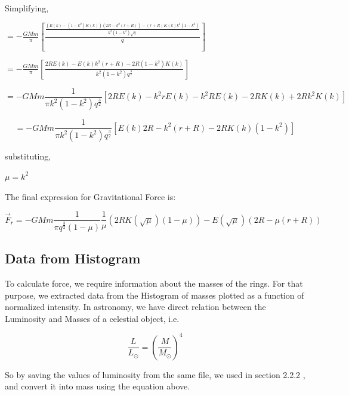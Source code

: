 Simplifying,

\begin{center}


$ = - \frac{GMm }{\pi} [\frac{\frac{(E(k)- (1 - k^2 )K(k))(2 R - k^2 (r + R)) - (r + R) K(k) k^2 (1 - k^2)}{k^2 (1-k^2)\sqrt{q}}}{q}] $


$ = - \frac{GMm }{\pi} [\frac{2 R E(k) - E (k) k^2 (r+R) - 2 R(1-k^2) K(k)}{k^2 (1 - k^2) q^\frac{3}{2}}] $





\begin{equation}
 = - GMm \frac{1}{\pi k^2 (1 - k ^2)  q^\frac{3}{2}} [2 R E (k) - k^2 r E(k)- k^2 R E(k) - 2 R K(k) + 2 R k^2 K(k)]
\end{equation}

\begin{equation}
 = - GMm \frac{1}{\pi k^2 (1 - k ^2)  q^\frac{3}{2}} [E (k) 2R - k^2 (r + R) - 2 R K(k) (1 - k^2) ] 
\end{equation}
\end{center}
 
substituting,
 \begin{center}
 $ \mu = k^2  $
 \end{center}


The final expression for Gravitational Force is:
\begin{center}

\begin{equation}
 \vec{F}_{r} = - GMm \frac{1}{\pi q^ \frac{3}{2} (1- \mu)} \frac{1}{\mu} (2 R K(\sqrt{\mu}) (1 - \mu))- E (\sqrt{\mu}) (2 R - \mu (r + R))
\end{equation}

\end{center}

\subsection{Data from Histogram}
To calculate force, we require information about the masses of the rings. For that purpose, we extracted data from the Histogram of masses plotted as a function of normalized intensity. In astronomy, we have direct relation between the Luminosity and Masses of a celestial object, i.e. 

\begin{equation}
\frac{L}{L_{\odot}} = (\frac{M}{M_{\odot}})^4 
\end{equation}

So by saving the values of luminosity from the same file, we used in section 2.2.2 , and convert it into mass using the equation above. 

